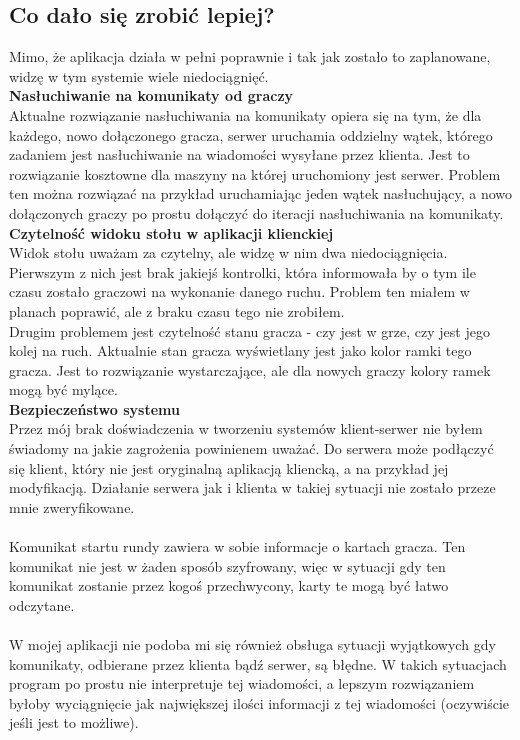 \documentclass{article}
\begin{document}
    \subsection{Co dało się zrobić lepiej?}
        Mimo, że aplikacja działa w pełni poprawnie i tak jak zostało to zaplanowane, widzę w tym systemie wiele niedociągnięć.\\
        
        \vspace{2mm}
        \textbf{Nasłuchiwanie na komunikaty od graczy}\\
            Aktualne rozwiązanie nasłuchiwania na komunikaty opiera się na tym, że dla każdego, nowo dołączonego gracza, serwer uruchamia oddzielny wątek, którego zadaniem jest nasłuchiwanie na wiadomości wysyłane przez klienta.
            Jest to rozwiązanie kosztowne dla maszyny na której uruchomiony jest serwer.
            Problem ten można rozwiązać na przykład uruchamiając jeden wątek nasłuchujący, a nowo dołączonych graczy po prostu dołączyć do iteracji nasłuchiwania na komunikaty.
        \\
        \vspace{2mm}
        \textbf{Czytelność widoku stołu w aplikacji klienckiej}\\
            Widok stołu uważam za czytelny, ale widzę w nim dwa niedociągnięcia.
            Pierwszym z nich jest brak jakiejś kontrolki, która informowała by o tym ile czasu zostało graczowi na wykonanie danego ruchu.
            Problem ten miałem w planach poprawić, ale z braku czasu tego nie zrobiłem.\\
            Drugim problemem jest czytelność stanu gracza - czy jest w grze, czy jest jego kolej na ruch.
            Aktualnie stan gracza wyświetlany jest jako kolor ramki tego gracza. Jest to rozwiązanie wystarczające, ale dla nowych graczy kolory ramek mogą być mylące.
        \\
        \vspace{2mm}
        \textbf{Bezpieczeństwo systemu}\\ %
            Przez mój brak doświadczenia w tworzeniu systemów klient-serwer nie byłem świadomy na jakie zagrożenia powinienem uważać.
            Do serwera może podłączyć się klient, który nie jest oryginalną aplikacją kliencką, a na przykład jej modyfikacją.
            Działanie serwera jak i klienta w takiej sytuacji nie zostało przeze mnie zweryfikowane.\\
            \\
            Komunikat startu rundy zawiera w sobie informacje o kartach gracza.
            Ten komunikat nie jest w żaden sposób szyfrowany, więc w sytuacji gdy ten komunikat zostanie przez kogoś przechwycony, karty te mogą być łatwo odczytane.\\
            \\
            W mojej aplikacji nie podoba mi się również obsługa sytuacji wyjątkowych gdy komunikaty, odbierane przez klienta bądź serwer, są błędne.
            W takich sytuacjach program po prostu nie interpretuje tej wiadomości, a lepszym rozwiązaniem byłoby wyciągnięcie jak największej ilości informacji z tej wiadomości (oczywiście jeśli jest to możliwe).
        
\end{document}
